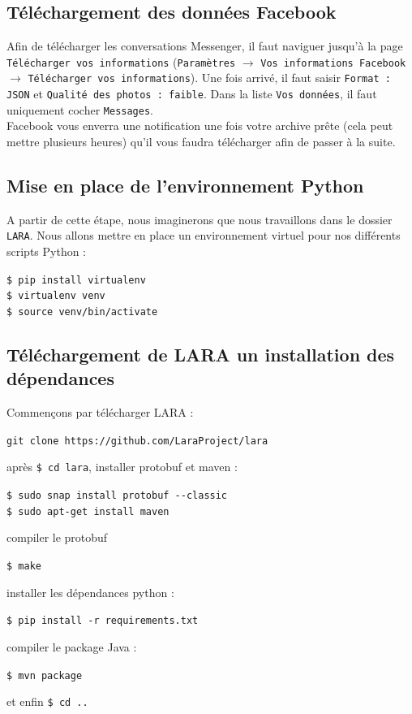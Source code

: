 \documentclass[10pt,a4paper]{article}
\newcommand\tab[1][0.5cm]{\hspace*{#1}}
\begin{document}
\subsection{Téléchargement des données Facebook}
Afin de télécharger les conversations Messenger, il faut naviguer jusqu'à la page \texttt{Télécharger vos informations} (\texttt{Paramètres} $\longrightarrow$ \texttt{Vos informations Facebook} $\longrightarrow$ \texttt{Télécharger vos informations}). Une fois arrivé, il faut saisir \texttt{Format : JSON} et \texttt{Qualité des photos : faible}. Dans la liste \texttt{Vos données}, il faut uniquement cocher \texttt{Messages}. \\
\tab Facebook vous enverra une notification une fois votre archive prête (cela peut mettre plusieurs heures) qu'il vous faudra télécharger afin de passer à la suite.
\subsection{Mise en place de l'environnement Python}
A partir de cette étape, nous imaginerons que nous travaillons dans le dossier \texttt{LARA}. Nous allons mettre en place un environnement virtuel pour nos différents scripts Python :
\begin{center}
	\texttt{\$ pip install virtualenv} \\
	\texttt{\$ virtualenv venv} \\
	\texttt{\$ source venv/bin/activate}
\end{center}
\subsection{Téléchargement de LARA un installation des dépendances}
Commençons par télécharger LARA :
\begin{center}
	\texttt{git clone https://github.com/LaraProject/lara}
\end{center}
après \texttt{\$ cd lara}, installer protobuf et maven :
\begin{center}
	\texttt{\$ sudo snap install protobuf -{}-classic} \\
	\texttt{\$ sudo apt-get install maven}
\end{center}
compiler le protobuf
\begin{center}
    \texttt{\$ make}
\end{center}
installer les dépendances python :
\begin{center}
	\texttt{\$ pip install -r requirements.txt}
\end{center}
compiler le package Java :
\begin{center}
	\texttt{\$ mvn package}
\end{center}
et enfin \texttt{\$ cd ..}
\end{document}

